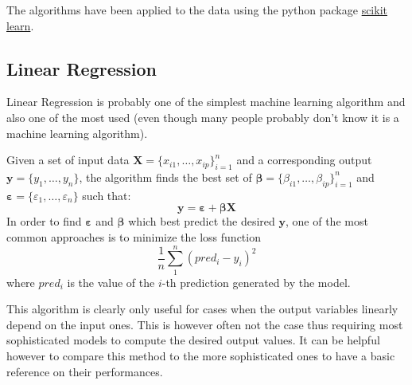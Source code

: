 The algorithms have been applied to the data using the python package \href{https://scikit-learn.org/}{scikit learn}.
\subsection{Linear Regression}\label{linearregr}
Linear Regression is probably one of the simplest machine learning algorithm and also one of the most used (even though many people probably don't know it is a machine learning algorithm).

Given a set of input data $\bm{X} = \{x_{i1},\ldots ,x_{ip}\}_{i=1}^{n}$ and a corresponding output $\mathbf{y} = \{y_{1},\ldots ,y_{n}\}$, the algorithm finds the best set of $\bm{\beta} = \{\beta_{i1},\ldots ,\beta_{ip}\}_{i=1}^{n}$ and $\bm{\varepsilon} = \{\varepsilon_{1},\ldots ,\varepsilon_{n}\}$ such that:
\begin{equation}\label{eq:linear}
\mathbf {y} = \bm{\varepsilon} + \bm{\beta}\bm{X}
\end{equation}
In order to find $\bm{\varepsilon}$ and $\bm{\beta}$ which best predict the desired $\mathbf {y}$, one of the most common approaches is to minimize the loss function
\begin{equation}
\frac{1}{n}\sum_{1}^{n}(pred_i-y_i)^2
\end{equation}
where $pred_i$ is the value of the $i$-th prediction generated by the model.

This algorithm is clearly only useful for cases when the output variables linearly depend on the input ones. This is however often not the case thus requiring most sophisticated models to compute the desired output values. It can be helpful however to compare this method to the more sophisticated ones to have a basic reference on their performances.

